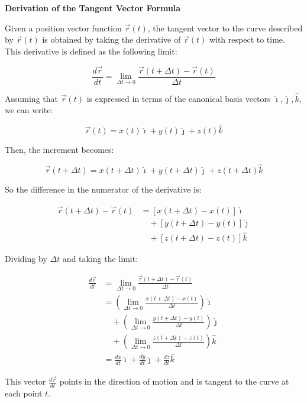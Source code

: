 \textbf{Derivation of the Tangent Vector Formula}

Given a position vector function \(\vec{r}(t)\), the tangent vector to the curve described by \(\vec{r}(t)\) is 
obtained by taking the derivative of \(\vec{r}(t)\) with respect to time. This derivative is defined as the following limit:

\[
\frac{d\vec{r}}{dt} = \lim_{\Delta t \to 0} \frac{\vec{r}(t + \Delta t) - \vec{r}(t)}{\Delta t}
\]

Assuming that \(\vec{r}(t)\) is expressed in terms of the canonical basis vectors \(\hat{\imath}, \hat{\jmath}, \hat{k}\), 
we can write:

\[
\vec{r}(t) = x(t)\hat{\imath} + y(t)\hat{\jmath} + z(t)\hat{k}
\]

Then, the increment becomes:

\[
\vec{r}(t + \Delta t) = x(t + \Delta t)\hat{\imath} + y(t + \Delta t)\hat{\jmath} + z(t + \Delta t)\hat{k}
\]

So the difference in the numerator of the derivative is:

\begin{align*}
\vec{r}(t + \Delta t) - \vec{r}(t) &= \left[x(t + \Delta t) - x(t)\right]\hat{\imath} \\
&\quad + \left[y(t + \Delta t) - y(t)\right]\hat{\jmath} \\
&\quad + \left[z(t + \Delta t) - z(t)\right]\hat{k}
\end{align*}

Dividing by \(\Delta t\) and taking the limit:

\begin{align*}
\frac{d\vec{r}}{dt} &= \lim_{\Delta t \to 0} \frac{\vec{r}(t + \Delta t) - \vec{r}(t)}{\Delta t} \\
&= \left( \lim_{\Delta t \to 0} \frac{x(t + \Delta t) - x(t)}{\Delta t} \right) \hat{\imath} \\
&\quad + \left( \lim_{\Delta t \to 0} \frac{y(t + \Delta t) - y(t)}{\Delta t} \right) \hat{\jmath} \\
&\quad + \left( \lim_{\Delta t \to 0} \frac{z(t + \Delta t) - z(t)}{\Delta t} \right) \hat{k} \\
&= \frac{dx}{dt} \hat{\imath} + \frac{dy}{dt} \hat{\jmath} + \frac{dz}{dt} \hat{k}
\end{align*}

This vector \(\frac{d\vec{r}}{dt}\) points in the direction of motion and is tangent to the curve at each point \(t\).


